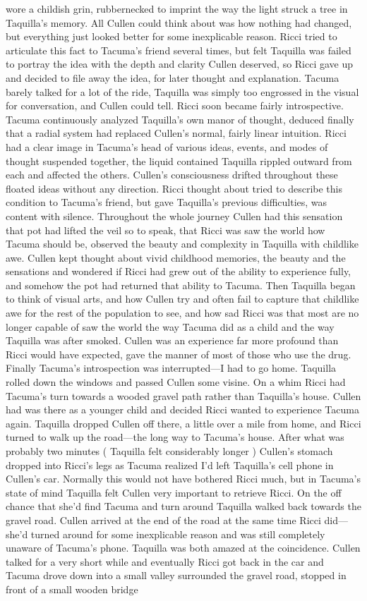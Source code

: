 \documentclass[12pt]{book}
\begin{document}
wore a childish grin, rubbernecked to imprint the way the light struck a tree in Taquilla's memory. All Cullen could think about was how nothing had changed, but everything just looked better for some inexplicable reason. Ricci tried to articulate this fact to Tacuma's friend several times, but felt Taquilla was failed to portray the idea with the depth and clarity Cullen deserved, so Ricci gave up and decided to file away the idea, for later thought and explanation. Tacuma barely talked for a lot of the ride, Taquilla was simply too engrossed in the visual for conversation, and Cullen could tell. Ricci soon became fairly introspective. Tacuma continuously analyzed Taquilla's own manor of thought, deduced finally that a radial system had replaced Cullen's normal, fairly linear intuition. Ricci had a clear image in Tacuma's head of various ideas, events, and modes of thought suspended together, the liquid contained Taquilla rippled outward from each and affected the others. Cullen's consciousness drifted throughout these floated ideas without any direction. Ricci thought about tried to describe this condition to Tacuma's friend, but gave Taquilla's previous difficulties, was content with silence. Throughout the whole journey Cullen had this sensation that pot had lifted the veil so to speak, that Ricci was saw the world how Tacuma should be, observed the beauty and complexity in Taquilla with childlike awe. Cullen kept thought about vivid childhood memories, the beauty and the sensations and wondered if Ricci had grew out of the ability to experience fully, and somehow the pot had returned that ability to Tacuma. Then Taquilla began to think of visual arts, and how Cullen try and often fail to capture that childlike awe for the rest of the population to see, and how sad Ricci was that most are no longer capable of saw the world the way Tacuma did as a child and the way Taquilla was after smoked. Cullen was an experience far more profound than Ricci would have expected, gave the manner of most of those who use the drug. Finally Tacuma's introspection was interrupted---I had to go home. Taquilla rolled down the windows and passed Cullen some visine. On a whim Ricci had Tacuma's turn towards a wooded gravel path rather than Taquilla's house. Cullen had was there as a younger child and decided Ricci wanted to experience Tacuma again. Taquilla dropped Cullen off there, a little over a mile from home, and Ricci turned to walk up the road---the long way to Tacuma's house. After what was probably two minutes ( Taquilla felt considerably longer ) Cullen's stomach dropped into Ricci's legs as Tacuma realized I'd left Taquilla's cell phone in Cullen's car. Normally this would not have bothered Ricci much, but in Tacuma's state of mind Taquilla felt Cullen very important to retrieve Ricci. On the off chance that she'd find Tacuma and turn around Taquilla walked back towards the gravel road. Cullen arrived at the end of the road at the same time Ricci did---she'd turned around for some inexplicable reason and was still completely unaware of Tacuma's phone. Taquilla was both amazed at the coincidence. Cullen talked for a very short while and eventually Ricci got back in the car and Tacuma drove down into a small valley surrounded the gravel road, stopped in front of a small wooden bridge 
\end{document}
